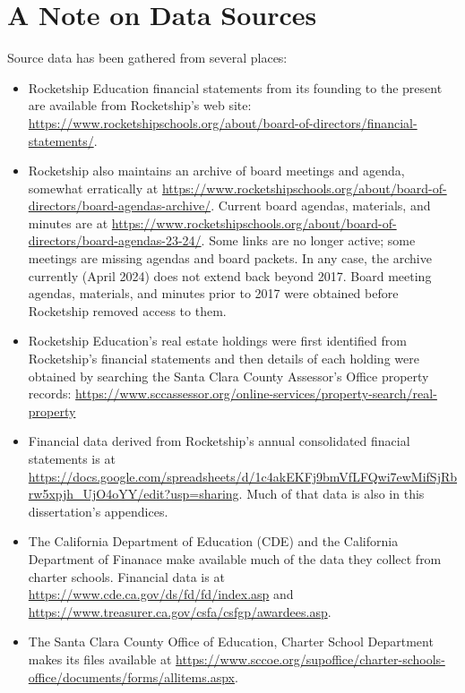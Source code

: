 
\chapter{A Note on Data Sources}\indent%


Source data has been gathered from several places:
\begin{itemize}
  \item Rocketship Education financial statements from its founding to the present are available from Rocketship's web site: \url{https://www.rocketshipschools.org/about/board-of-directors/financial-statements/}.
  \item Rocketship also maintains an archive of board meetings and agenda, somewhat erratically at \url{https://www.rocketshipschools.org/about/board-of-directors/board-agendas-archive/}. Current board agendas, materials, and minutes are at \url{https://www.rocketshipschools.org/about/board-of-directors/board-agendas-23-24/}. Some links are no longer active; some meetings are missing agendas and board packets. In any case, the archive currently (April 2024) does not extend back beyond 2017. Board meeting agendas, materials, and minutes prior to 2017 were obtained before Rocketship removed access to them.
  \item Rocketship Education's real estate holdings were first identified from Rocketship's financial statements and then details of each holding were obtained by searching the Santa Clara County Assessor's Office property records: \url{https://www.sccassessor.org/online-services/property-search/real-property}
  \item Financial data derived from Rocketship's annual consolidated finacial statements is at \url{https://docs.google.com/spreadsheets/d/1c4akEKFj9bmVfLFQwi7ewMifSjRbrw5xpjh_UjO4oYY/edit?usp=sharing}. Much of that data is also in this dissertation's appendices.
  \item The California Department of Education (CDE) and the California Department of Finanace make available much of the data they collect from charter schools. Financial data is at \url{https://www.cde.ca.gov/ds/fd/fd/index.asp} and \url{https://www.treasurer.ca.gov/csfa/csfgp/awardees.asp}.
  \item The Santa Clara County Office of Education, Charter School Department makes its files available at \url{https://www.sccoe.org/supoffice/charter-schools-office/documents/forms/allitems.aspx}.
\end{itemize}

